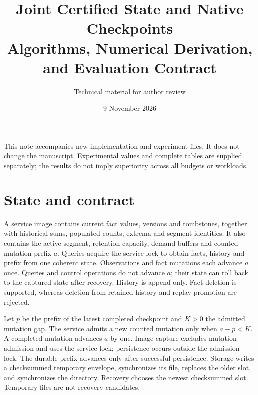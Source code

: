 \documentclass[10pt]{article}
\title{Joint Certified State and Native Checkpoints\\Algorithms, Numerical Derivation, and Evaluation Contract}
\author{Technical material for author review}
\date{9 November 2026}
\begin{document}
\maketitle
\noindent This note accompanies new implementation and experiment files. It does not change the manuscript. Experimental values and complete tables are supplied separately; the results do not imply superiority across all budgets or workloads.

\section{State and contract}
A service image contains current fact values, versions and tombstones, together with historical sums, populated counts, extrema and segment identities. It also contains the active segment, retention capacity, demand buffers and counted mutation prefix $a$. Queries acquire the service lock to obtain facts, history and prefix from one coherent state. Observations and fact mutations each advance $a$ once. Queries and control operations do not advance $a$; their state can roll back to the captured state after recovery. History is append-only. Fact deletion is supported, whereas deletion from retained history and replay promotion are rejected.

Let $p$ be the prefix of the latest completed checkpoint and $K>0$ the admitted mutation gap. The service admits a new counted mutation only when $a-p<K$. A completed mutation advances $a$ by one. Image capture excludes mutation admission and uses the service lock; persistence occurs outside the admission lock. The durable prefix advances only after successful persistence. Storage writes a checksummed temporary envelope, synchronizes its file, replaces the older slot, and synchronizes the directory. Recovery chooses the newest checksummed slot. Temporary files are not recovery candidates.
\end{document}
